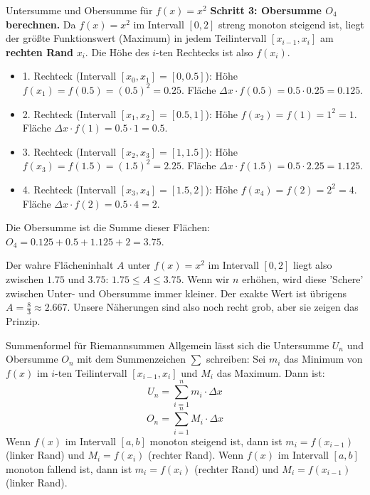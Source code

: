 \begin{beispielumgebung}{Untersumme und Obersumme für $f(x)=x^2$}
\textbf{Schritt 3: Obersumme $O_4$ berechnen.}
Da $f(x)=x^2$ im Intervall $[0,2]$ streng monoton steigend ist, liegt der größte Funktionswert (Maximum) in jedem Teilintervall $[x_{i-1}, x_i]$ am \textbf{rechten Rand} $x_i$. Die Höhe des $i$-ten Rechtecks ist also $f(x_i)$.
\begin{itemize}
    \item 1. Rechteck (Intervall $[x_0, x_1] = [0, 0.5]$): Höhe $f(x_1) = f(0.5) = (0.5)^2 = 0.25$. Fläche $\Delta x \cdot f(0.5) = 0.5 \cdot 0.25 = 0.125$.
    \item 2. Rechteck (Intervall $[x_1, x_2] = [0.5, 1]$): Höhe $f(x_2) = f(1) = 1^2 = 1$. Fläche $\Delta x \cdot f(1) = 0.5 \cdot 1 = 0.5$.
    \item 3. Rechteck (Intervall $[x_2, x_3] = [1, 1.5]$): Höhe $f(x_3) = f(1.5) = (1.5)^2 = 2.25$. Fläche $\Delta x \cdot f(1.5) = 0.5 \cdot 2.25 = 1.125$.
    \item 4. Rechteck (Intervall $[x_3, x_4] = [1.5, 2]$): Höhe $f(x_4) = f(2) = 2^2 = 4$. Fläche $\Delta x \cdot f(2) = 0.5 \cdot 4 = 2$.
\end{itemize}
Die Obersumme ist die Summe dieser Flächen:
$O_4 = 0.125 + 0.5 + 1.125 + 2 = 3.75$.

Der wahre Flächeninhalt $A$ unter $f(x)=x^2$ im Intervall $[0,2]$ liegt also zwischen $1.75$ und $3.75$:
$1.75 \le A \le 3.75$.
Wenn wir $n$ erhöhen, wird diese 'Schere' zwischen Unter- und Obersumme immer kleiner. Der exakte Wert ist übrigens $A = \frac{8}{3} \approx 2.667$. Unsere Näherungen sind also noch recht grob, aber sie zeigen das Prinzip.
\end{beispielumgebung}

\begin{tippumgebung}{Summenformel für Riemannsummen}
Allgemein lässt sich die Untersumme $U_n$ und Obersumme $O_n$ mit dem Summenzeichen $\sum$ schreiben:
Sei $m_i$ das Minimum von $f(x)$ im $i$-ten Teilintervall $[x_{i-1}, x_i]$ und $M_i$ das Maximum.
Dann ist:
\[ U_n = \sum_{i=1}^{n} m_i \cdot \Delta x \]
\[ O_n = \sum_{i=1}^{n} M_i \cdot \Delta x \]
Wenn $f(x)$ im Intervall $[a,b]$ monoton steigend ist, dann ist $m_i = f(x_{i-1})$ (linker Rand) und $M_i = f(x_i)$ (rechter Rand).
Wenn $f(x)$ im Intervall $[a,b]$ monoton fallend ist, dann ist $m_i = f(x_i)$ (rechter Rand) und $M_i = f(x_{i-1})$ (linker Rand).
\end{tippumgebung}

